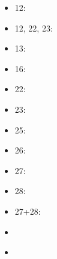 \documentclass{ifacconf}
\begin{document}
\begin{itemize}
  \item 12: \cite{bi:12}
  \item 12, 22, 23: \cite{bi:12,bi:22,bi:23}
  \item 13: \cite{bi:13}
  \item 16: \cite{bi:16}
  \item 22: \cite{bi:22}
  \item 23: \cite{bi:23}
  \item 25: \cite{bi:25}
  \item 26: \cite{bi:26}
  \item 27: \cite{bi:27}
  \item 28: \cite{bi:28}
  \item 27+28: \cite{bi:27,bi:28}
  \item \cite{bi:salman}
  \item \cite{bi:lib}
\end{itemize}
  
\end{document}
